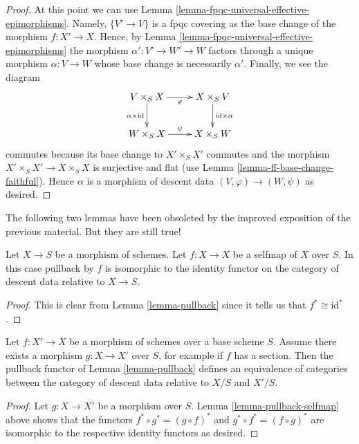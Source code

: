 \begin{proof}
\medskip\noindent
At this point we can use
Lemma \ref{lemma-fpqc-universal-effective-epimorphisms}.
Namely, $\{V' \to V\}$ is a fpqc covering as
the base change of the morphism $f : X' \to X$.
Hence, by
Lemma \ref{lemma-fpqc-universal-effective-epimorphisms}
the morphism $\alpha' : V' \to W' \to W$ factors through
a unique morphism $\alpha : V \to W$ whose base change is
necessarily $\alpha'$. Finally, we see the diagram
$$
\xymatrix{
V \times_S X \ar[r]_{\varphi} \ar[d]_{\alpha \times \text{id}} &
X \times_S V \ar[d]^{\text{id} \times \alpha} \\
W \times_S X \ar[r]^{\psi} & X \times_S W
}
$$
commutes because its base change to $X' \times_S X'$
commutes and the morphism $X' \times_S X' \to X \times_S X$
is surjective and flat (use Lemma \ref{lemma-ff-base-change-faithful}).
Hence $\alpha$ is a morphism of descent data
$(V, \varphi) \to (W, \psi)$ as desired.
\end{proof}

\noindent
The following two lemmas have been obsoleted by the improved
exposition of the previous material. But they are still true!

\begin{lemma}
\label{lemma-pullback-selfmap}
Let $X \to S$ be a morphism of schemes.
Let $f : X \to X$ be a selfmap of $X$ over $S$.
In this case pullback by $f$ is isomorphic to the
identity functor on the category of descent data
relative to $X \to S$.
\end{lemma}

\begin{proof}
This is clear from Lemma \ref{lemma-pullback} since it tells us that
$f^* \cong \text{id}^*$.
\end{proof}

\begin{lemma}
\label{lemma-morphism-with-section-equivalence}
Let $f : X' \to X$ be a morphism of schemes over a base scheme $S$.
Assume there exists a morphism $g : X \to X'$ over $S$, for example
if $f$ has a section. Then the pullback functor
of Lemma \ref{lemma-pullback} defines an equivalence of
categories between the category of descent data relative to
$X/S$ and $X'/S$.
\end{lemma}

\begin{proof}
Let $g : X \to X'$ be a morphism over $S$.
Lemma \ref{lemma-pullback-selfmap} above shows that the functors
$f^* \circ g^* = (g \circ f)^*$ and $g^* \circ f^* = (f \circ g)^*$
are isomorphic
to the respective identity functors as desired.
\end{proof}

